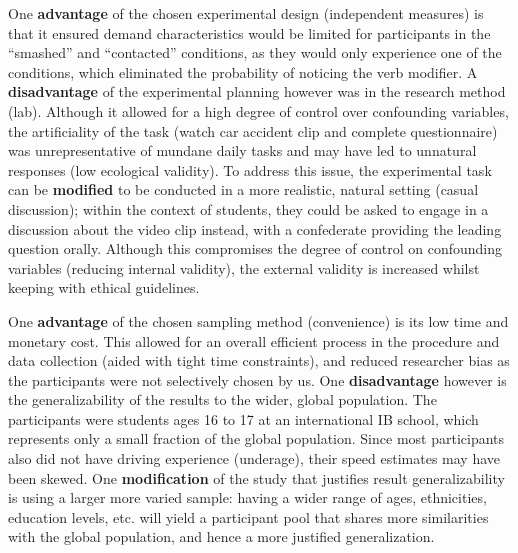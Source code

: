 \documentclass[12pt]{article}
\begin{document}
One \textbf{advantage} of the chosen experimental design (independent measures) is that it ensured demand characteristics would be limited for participants in the “smashed” and “contacted” conditions, as they would only experience one of the conditions, which eliminated the probability of noticing the verb modifier. A \textbf{disadvantage} of the experimental planning however was in the research method (lab). Although it allowed for a high degree of control over confounding variables, the artificiality of the task (watch car accident clip and complete questionnaire) was unrepresentative of mundane daily tasks and may have led to unnatural responses (low ecological validity). To address this issue, the experimental task can be \textbf{modified} to be conducted in a more realistic, natural setting (casual discussion); within the context of students, they could be asked to engage in a discussion about the video clip instead, with a confederate providing the leading question orally. Although this compromises the degree of control on confounding variables (reducing internal validity), the external validity is increased whilst keeping with ethical guidelines. 

One \textbf{advantage} of the chosen sampling method (convenience) is its low time and monetary cost. This allowed for an overall efficient process in the procedure and data collection (aided with tight time constraints), and reduced researcher bias as the participants were not selectively chosen by us. One \textbf{disadvantage} however is the generalizability of the results to the wider, global population. The participants were students ages 16 to 17 at an international IB school, which represents only a small fraction of the global population. Since most participants also did not have driving experience (underage), their speed estimates may have been skewed. One \textbf{modification} of the study that justifies result generalizability is using a larger more varied sample: having a wider range of ages, ethnicities, education levels, etc. will yield a participant pool that shares more similarities with the global population, and hence a more justified generalization. 
\end{document}
